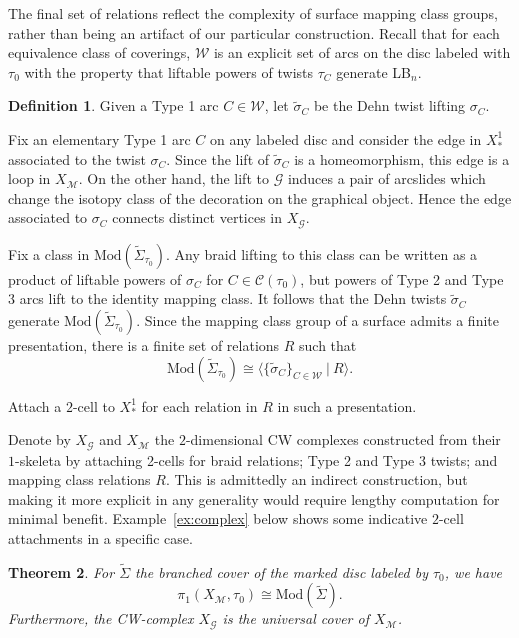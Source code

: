 \documentclass{amsart}
\newtheorem{theorem}{Theorem}[section]
\theoremstyle{definition}
\newtheorem{definition}[theorem]{Definition}
\def\ws{\widetilde{\Sigma}}
\begin{document}
The final set of relations reflect the complexity of surface mapping class groups, rather than being an artifact of our particular construction. Recall that for each equivalence class of coverings,  $\mathcal{W}$ is an explicit set of  arcs on the disc labeled with $\tau_0$ with the property that liftable powers of twists $\tau_C$ generate LB$_n$. 


\begin{definition} Given a Type 1 arc $C\in \mathcal{W}$, let $\widetilde{\sigma}_C$ be the Dehn twist lifting $\sigma_C$.  
\end{definition}

Fix an elementary Type 1 arc $C$ on any labeled disc and consider the edge in $X^1_*$ associated to the twist $\sigma_C$.  Since the lift of $\widetilde{\sigma}_C$ is a homeomorphism, this edge is a loop in $X_\mathcal{M}$.  On the other hand, the lift to $\mathcal{G}$ induces a pair of arcslides which change the isotopy class of the decoration on the graphical object.  Hence the edge associated to $\sigma_C$ connects distinct vertices in $X_\mathcal{G}$.

Fix a class in $\text{Mod}(\ws_{\tau_0})$.  Any braid lifting to this class can be written as a product of liftable powers of $\sigma_C$ for $C \in \mathcal{C}(\tau_0)$, but powers of Type 2 and Type 3 arcs lift to the identity mapping class.  It follows that the Dehn twists $\widetilde{\sigma}_C$ generate $\text{Mod}(\ws_{\tau_0})$.  Since the mapping class group of a surface admits a finite presentation, there is a finite set of relations $R$ such that 
\[ \text{Mod}(\ws_{\tau_0})\cong \langle \{\widetilde{\sigma}_C\}_{C\in \mathcal{W}} \ | \ R\rangle.\]

Attach a $2$-cell to $X^1_*$ for each relation in $R$ in such a presentation. 


Denote by $X_\mathcal{G}$ and $X_\mathcal{M}$ the $2$-dimensional CW complexes constructed from their $1$-skeleta by attaching 2-cells for braid relations; Type 2 and Type 3 twists; and mapping class relations $R$.   This is admittedly an indirect construction, but making it more explicit in any generality would require lengthy computation for minimal benefit.   Example~\ref{ex:complex} below shows some indicative $2$-cell attachments in a specific case.

\begin{theorem}\label{thm:cover} For $\ws$ the branched cover of the marked disc labeled by $\tau_0$, we have \[ \pi_1(X_\mathcal{M}, \tau_0)\cong\text{Mod}(\ws).\]  Furthermore, the CW-complex $X_\mathcal{G}$ is the universal cover of $X_\mathcal{M}$.  
\end{theorem} 
\end{document}
